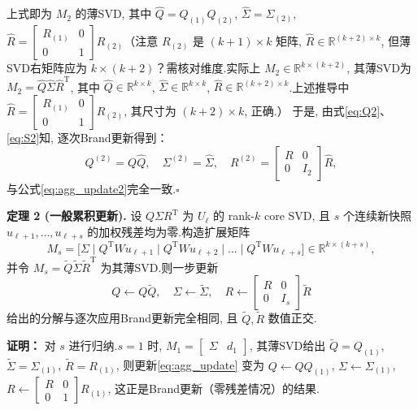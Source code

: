 上式即为 $M_2$ 的薄SVD, 其中 $\widehat Q = Q_{(1)}Q_{(2)}$, $\widehat\Sigma = \Sigma_{(2)}$, $\widehat R = \begin{bmatrix} R_{(1)} & 0 \\ 0 & 1 \end{bmatrix} R_{(2)}$（注意 $R_{(2)}$ 是 $(k+1)\times k$ 矩阵, $\widehat R \in \mathbb{R}^{(k+2)\times k}$, 但薄SVD右矩阵应为 $k\times (k+2)$？需核对维度.实际上 $M_2 \in \mathbb{R}^{k\times (k+2)}$, 其薄SVD为 $M_2 = \widehat Q \widehat\Sigma \widehat R^{\mathrm T}$, 其中 $\widehat Q\in\mathbb{R}^{k\times k}$, $\widehat\Sigma\in\mathbb{R}^{k\times k}$, $\widehat R\in\mathbb{R}^{(k+2)\times k}$.上述推导中 $\widehat R = \begin{bmatrix} R_{(1)} & 0 \\ 0 & 1 \end{bmatrix} R_{(2)}$, 其尺寸为 $(k+2)\times k$, 正确.）
于是, 由式\eqref{eq:Q2}、\eqref{eq:S2}知, 逐次Brand更新得到：
\begin{equation}
Q^{(2)} = Q \widehat Q,\quad \Sigma^{(2)} = \widehat\Sigma,\quad R^{(2)} = \begin{bmatrix}R & 0\\0 & I_2\end{bmatrix} \widehat R,
\end{equation}
与公式\eqref{eq:agg_update2}完全一致.$\square$

\noindent\textbf{定理 2 (一般累积更新).} 
设 $Q\Sigma R^{\mathrm T}$ 为 $U_\ell$ 的 rank-$k$ core SVD, 且 $s$ 个连续新快照 $u_{\ell+1},\dots,u_{\ell+s}$ 的加权残差均为零.构造扩展矩阵
\begin{equation}
M_s = \bigl[\Sigma \mid Q^{\mathrm T}W u_{\ell+1} \mid Q^{\mathrm T}W u_{\ell+2} \mid \dots \mid Q^{\mathrm T}W u_{\ell+s}\bigr]\in\mathbb{R}^{k\times(k+s)},
\end{equation}
并令 $M_s = \widetilde Q\widetilde\Sigma\widetilde R^{\mathrm T}$ 为其薄SVD.则一步更新
\begin{equation}
Q \leftarrow Q\widetilde Q,\quad \Sigma\leftarrow\widetilde\Sigma,\quad R\leftarrow\begin{bmatrix}R & 0\\0 & I_s\end{bmatrix}\widetilde R
\label{eq:agg_update}
\end{equation}
给出的分解与逐次应用Brand更新完全相同, 且 $\widetilde Q,\widetilde R$ 数值正交.

\noindent\textbf{证明：} 
对 $s$ 进行归纳.$s=1$ 时, $M_1 = \begin{bmatrix}\Sigma & d_1\end{bmatrix}$, 其薄SVD给出 $\widetilde Q = Q_{(1)}$, $\widetilde\Sigma = \Sigma_{(1)}$, $\widetilde R = R_{(1)}$, 则更新\eqref{eq:agg_update} 变为 $Q\leftarrow Q Q_{(1)}$, $\Sigma\leftarrow\Sigma_{(1)}$, $R\leftarrow \begin{bmatrix}R & 0\\0 & 1\end{bmatrix} R_{(1)}$, 这正是Brand更新（零残差情况）的结果.

